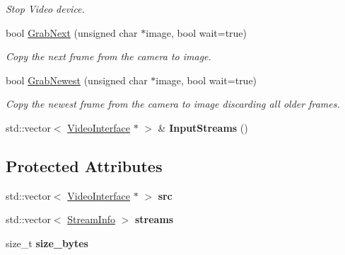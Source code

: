 \begin{DoxyCompactItemize}
\begin{DoxyCompactList}\small\item\em Stop Video device. \end{DoxyCompactList}\item 
bool \hyperlink{classpangolin_1_1_video_joiner_a54719b11d488f8b011ada9050646bcc0}{Grab\+Next} (unsigned char $\ast$image, bool wait=true)
\begin{DoxyCompactList}\small\item\em Copy the next frame from the camera to image. \end{DoxyCompactList}\item 
bool \hyperlink{classpangolin_1_1_video_joiner_a142ee897491581645c0f168673a3f932}{Grab\+Newest} (unsigned char $\ast$image, bool wait=true)
\begin{DoxyCompactList}\small\item\em Copy the newest frame from the camera to image discarding all older frames. \end{DoxyCompactList}\item 
std\+::vector$<$ \hyperlink{structpangolin_1_1_video_interface}{Video\+Interface} $\ast$ $>$ \& {\bfseries Input\+Streams} ()\hypertarget{classpangolin_1_1_video_joiner_aff4636355426ba2bac61d219039bbbdd}{}\label{classpangolin_1_1_video_joiner_aff4636355426ba2bac61d219039bbbdd}

\end{DoxyCompactItemize}
\subsection*{Protected Attributes}
\begin{DoxyCompactItemize}
\item 
std\+::vector$<$ \hyperlink{structpangolin_1_1_video_interface}{Video\+Interface} $\ast$ $>$ {\bfseries src}\hypertarget{classpangolin_1_1_video_joiner_a08fff09d58e6cc9804d9423d70069752}{}\label{classpangolin_1_1_video_joiner_a08fff09d58e6cc9804d9423d70069752}

\item 
std\+::vector$<$ \hyperlink{classpangolin_1_1_stream_info}{Stream\+Info} $>$ {\bfseries streams}\hypertarget{classpangolin_1_1_video_joiner_a903ffed1e03d51e53f4d2c79712a2979}{}\label{classpangolin_1_1_video_joiner_a903ffed1e03d51e53f4d2c79712a2979}

\item 
size\+\_\+t {\bfseries size\+\_\+bytes}\hypertarget{classpangolin_1_1_video_joiner_afaac17b37be28ef8b3379d15f6f3d62b}{}\label{classpangolin_1_1_video_joiner_afaac17b37be28ef8b3379d15f6f3d62b}

\end{DoxyCompactItemize}


